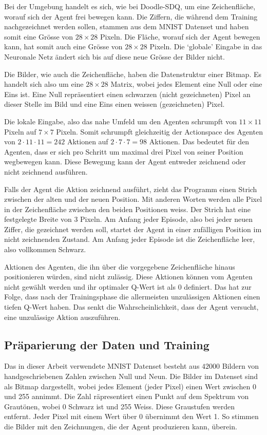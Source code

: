 Bei der Umgebung handelt es sich, wie bei Doodle-SDQ, um eine Zeichenfläche,
worauf sich der Agent frei bewegen kann. Die Ziffern, die während dem Training
nachgezeichnet werden sollen, stammen aus dem MNIST Datenset und haben somit
eine Grösse von $28\times28$ Pixeln. Die Fläche, worauf sich der Agent bewegen
kann, hat somit
auch eine Grösse von $28\times28$ Pixeln. Die `globale' Eingabe in das Neuronale
Netz ändert sich bis auf diese neue Grösse der Bilder nicht.

Die Bilder, wie auch die Zeichenfläche, haben die Datenstruktur einer Bitmap. Es
handelt sich also um eine $28\times28$ Matrix, wobei jedes Element eine Null oder eine 
Eins ist. Eine Null repräsentiert einen schwarzen (nicht gezeichneten) Pixel an
dieser Stelle im Bild und eine Eins einen weissen (gezeichneten) Pixel.

Die lokale Eingabe, also das nahe Umfeld um den Agenten schrumpft von
$11\times11$ Pixeln auf $7\times7$ Pixeln. Somit schrumpft gleichzeitig der
Actionspace des Agenten von $2\cdot11\cdot11 = 242$ Aktionen auf $2\cdot7\cdot7
= 98$ Aktionen. Das bedeutet für den Agenten, dass er sich pro Schritt um
maximal drei Pixel von seiner Position wegbewegen kann. Diese Bewegung
kann der Agent entweder zeichnend oder nicht zeichnend
ausführen.

Falls der Agent die Aktion zeichnend ausführt, zieht das Programm einen Strich
zwischen der alten und der neuen Position. Mit anderen Worten werden alle Pixel
in der Zeichenfläche zwischen den beiden Positionen weiss. Der Strich hat eine
festgelegte Breite von $3$ Pixeln. Am Anfang jeder Episode, also bei jeder neuen
Ziffer, die gezeichnet werden soll, startet der Agent in einer zufälligen
Position im nicht zeichnenden Zustand. Am Anfang jeder Episode ist die
Zeichenfläche leer, also vollkommen Schwarz.

Aktionen des Agenten, die ihn über die vorgegebene Zeichenfläche hinaus
positionieren würden, sind nicht zulässig. Diese Aktionen können vom Agenten
nicht gewählt werden und ihr optimaler Q-Wert ist als $0$ definiert. Das hat zur
Folge, dass nach der Trainingsphase die allermeisten unzulässigen Aktionen einen
tiefen Q-Wert haben. Das senkt die Wahrscheinlichkeit, dass der Agent versucht,
eine unzulässige Aktion auszuführen.


\subsection{Präparierung der Daten und Training}
Das in dieser Arbeit verwendete MNIST Datenset besteht aus $42000$ Bildern von
handgeschriebenen Zahlen zwischen Null und Neun. Die Bilder im Datenset sind als
Bitmap dargestellt, wobei jedes Element (jeder Pixel) einen Wert zwischen $0$ und
255 annimmt. Die Zahl räpresentiert einen Punkt auf dem Spektrum von Grautönen,
wobei 0 Schwarz ist und 255 Weiss. Diese Graustufen werden entfernt. Jeder Pixel
mit einem Wert über 0 übernimmt den Wert 1. So stimmen die Bilder mit den
Zeichnungen, die der Agent produzieren kann, überein.

